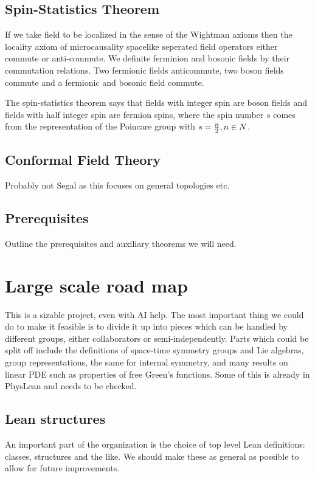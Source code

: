 \documentclass{article}
\begin{document}
\subsection{Spin-Statistics Theorem}\label{spintheorem}

If we take field to be localized in the sense of the Wightman axioms then the locality axiom of microcausality spacelike seperated field operators either commute or anti-commute. We definite ferminion and bosonic fields by their commutation relations. Two fermionic fields anticommute, two boson fields commute and a fermionic and bosonic field commute. 

The spin-statistics theorem says that fields with integer spin are boson fields and fields with half integer spin are fermion spins, where the spin number $s$ comes from the representation of the Poincare group with $s= {n \over 2}, n \in N$. 


\subsection{Conformal Field Theory}

Probably not Segal as this focuses on general topologies etc. 


\subsection{Prerequisites}
Outline the prerequisites and auxiliary theorems we will need.

\section{Large scale road map}

This is a sizable project, even with AI help.
The most important thing we could do to make it feasible is to divide it up into pieces
which can be handled by different groups, either collaborators or semi-independently.
Parts which could be split off include the definitions of space-time symmetry groups and Lie algebras,
group representations, the same for internal symmetry, and many results on linear PDE such as
properties of free Green's functions.  Some of this is already in PhysLean and needs to be checked.

\subsection{Lean structures}

An important part of the organization is the choice of top level Lean definitions: classes, structures and the like.
We should make these as general as possible to allow for future improvements.
\end{document}
